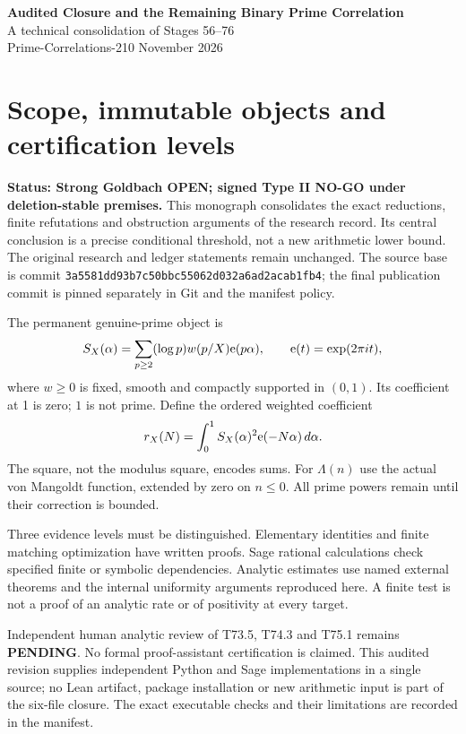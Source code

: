 \documentclass[11pt,a4paper]{article}
\newcommand{\status}[1]{\textbf{Status: #1.}}
\begin{document}
\begin{center}\Large\textbf{Audited Closure and the Remaining Binary Prime Correlation}\\[5pt]
\large A technical consolidation of Stages 56--76\\[4pt]
\normalsize Prime-Correlations-210 November 2026\end{center}
\section{Scope, immutable objects and certification levels}
\status{Strong Goldbach OPEN; signed Type II NO-GO under deletion-stable premises}
This monograph consolidates the exact reductions, finite refutations and obstruction arguments of the research record. Its central conclusion is a precise conditional threshold, not a new arithmetic lower bound. The original research and ledger statements remain unchanged. The source base is commit \texttt{3a5581dd93b7c50bbc55062d032a6ad2acab1fb4}; the final publication commit is pinned separately in Git and the manifest policy.

The permanent genuine-prime object is
\[
 S_X(\alpha)=\sum_{p\ge2}(\log p)w(p/X)\mathrm e(p\alpha),\qquad \mathrm e(t)=\exp(2\pi it),
\]
where $w\ge0$ is fixed, smooth and compactly supported in $(0,1)$. Its coefficient at 1 is zero; $1$ is not prime. Define the ordered weighted coefficient
\[
 r_X(N)=\int_0^1 S_X(\alpha)^2\mathrm e(-N\alpha)\,d\alpha.
\]
The square, not the modulus square, encodes sums. For $\Lambda(n)$ use the actual von Mangoldt function, extended by zero on $n\le0$. All prime powers remain until their correction is bounded.

Three evidence levels must be distinguished. Elementary identities and finite matching optimization have written proofs. Sage rational calculations check specified finite or symbolic dependencies. Analytic estimates use named external theorems and the internal uniformity arguments reproduced here. A finite test is not a proof of an analytic rate or of positivity at every target.

Independent human analytic review of T73.5, T74.3 and T75.1 remains \textbf{PENDING}. No formal proof-assistant certification is claimed. This audited revision supplies independent Python and Sage implementations in a single source; no Lean artifact, package installation or new arithmetic input is part of the six-file closure. The exact executable checks and their limitations are recorded in the manifest.
\end{document}
